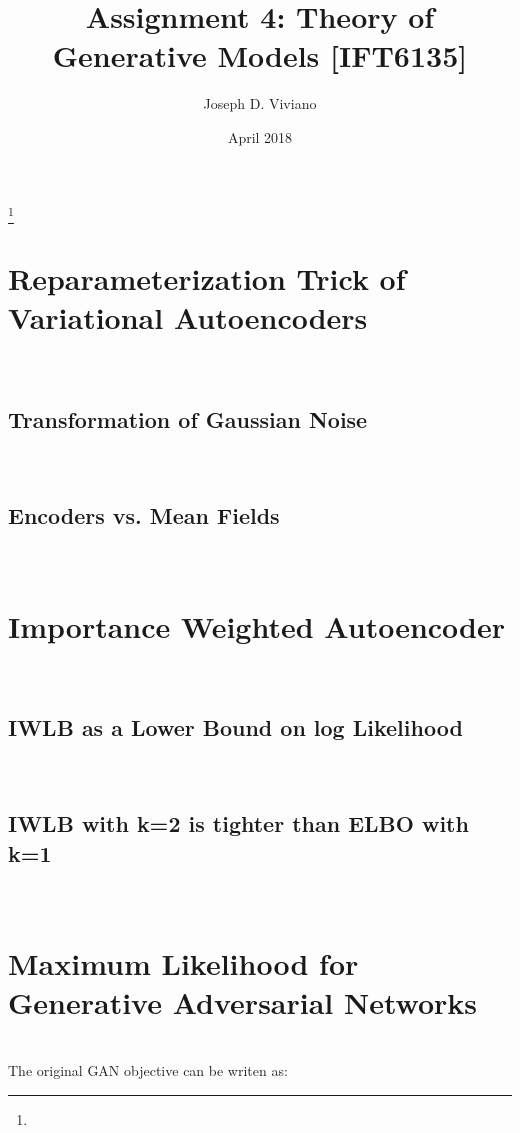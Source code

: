 \documentclass{amsart}
\numberwithin{equation}{section}
\theoremstyle{definition}
\theoremstyle{remark}
\begin{document}
\title{Assignment 4: Theory of Generative Models [IFT6135]}

\author{Joseph D. Viviano}
\address{Universit\'e de Montr\'eal}
\curraddr{}
\thanks{}
\date{April 2018}

\maketitle

\section{Reparameterization Trick of Variational Autoencoders} \\

\subsection{Transformation of Gaussian Noise} \\

\subsection{Encoders vs. Mean Fields} \\

\section{Importance Weighted Autoencoder} \\

\subsection{IWLB as a Lower Bound on log Likelihood} \\

\subsection{IWLB with k=2 is tighter than ELBO with k=1} \\

\section{Maximum Likelihood for Generative Adversarial Networks} \\

The original GAN objective can be writen as: \\
\end{document}
